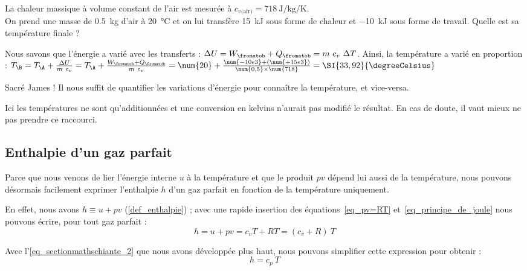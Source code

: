 		\begin{anexample}
			La chaleur massique à volume constant de l’air est mesurée à $c_{v\text{(air)}} = \SI{718}{\joule\per\kilogram\per\kelvin}$.\\
			On prend une masse de \SI{0,5}{\kilogram} d’air à \SI{20}{\degreeCelsius} et on lui transfère \SI{+15}{\kilo\joule} sous forme de chaleur et \SI{-10}{\kilo\joule} sous forme de travail. Quelle est sa température finale ?
				\begin{answer}
					Nous savons que l’énergie a varié avec les transferts : $\Delta U = W_\fromatob + Q_\fromatob = m \ c_v \ \Delta T$. Ainsi, la température a varié en proportion : $T_\B = T_\A + \frac{\Delta U}{m \ c_v} = T_\A + \frac{W_\fromatob + Q_\fromatob}{m \ c_v} = \num{20} + \frac{\num{-10e3} + (\num{+15e3})}{\num{0,5} \times \num{718}} = \SI{33,92}{\degreeCelsius}$
				\end{answer}
					\begin{remark}Sacré James ! Il nous suffit de quantifier les variations d’énergie pour connaître la température, et vice-versa.\end{remark}
					\begin{remark}Ici les températures ne sont qu’additionnées et une conversion en \si{kelvins} n’aurait pas modifié le résultat. En cas de doute, il vaut mieux ne pas prendre ce raccourci. \end{remark}
		\end{anexample}



	\subsection{Enthalpie d’un gaz parfait}

		Parce que nous venons de lier l’énergie interne $u$ à la température et que le produit $p v$ dépend lui aussi de la température, nous pouvons désormais facilement exprimer l’enthalpie $h$ d’un gaz parfait en fonction de la température uniquement.

		En effet, nous avons $h \equiv  u + p v$ (\ref{def_enthalpie}) ; avec une rapide insertion des équations~\ref{eq_pv=RT} et~\ref{eq_principe_de_joule} nous pouvons écrire, pour tout gaz parfait :
			\begin{equation}
				h = u + p v = c_v T + R T = (c_v + R) \ T
				\label{eq_h_fonction_de_T}
			\end{equation}

		Avec l’\cref{eq_sectionmathschiante_2} que nous avons développée plus haut, nous pouvons simplifier cette expression pour obtenir :
			\begin{equation}
				h = c_p \ T
				\label{eq_h=cpT}
			\end{equation}

